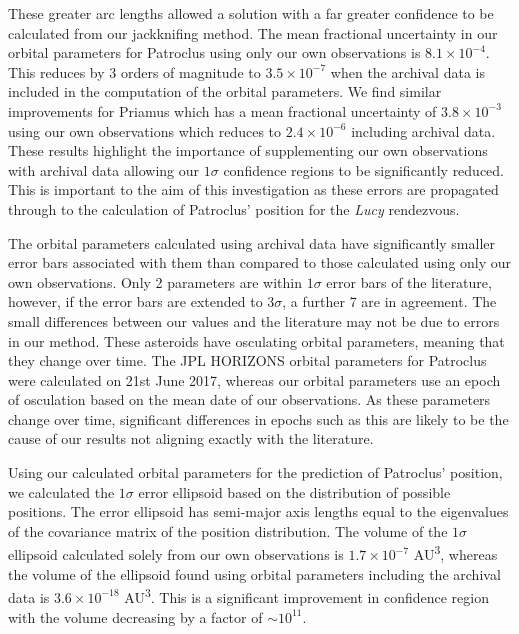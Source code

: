 \documentclass[10pt, twocolumn]{revtex4}    %
\begin{document}
These greater arc lengths allowed a solution with a far greater confidence to be calculated from our jackknifing method. The mean fractional uncertainty in our orbital parameters for Patroclus using only our own observations is $8.1 \times 10^{-4}$. This reduces by 3 orders of magnitude to $3.5 \times 10^{-7}$ when the archival data is included in the computation of the orbital parameters. We find similar improvements for Priamus which has a mean fractional uncertainty of $3.8 \times 10^{-3}$ using our own observations which reduces to $2.4 \times 10^{-6}$ including archival data. These results highlight the importance of supplementing our own observations with archival data allowing our $1\sigma$ confidence regions to be significantly reduced.  This is important to the aim of this investigation as these errors are propagated through to the calculation of Patroclus' position for the \textit{Lucy} rendezvous.

The orbital parameters calculated using archival data have significantly smaller error bars associated with them than compared to those calculated using only our own observations. Only 2 parameters are within $1\sigma$ error bars of the literature, however, if the error bars are extended to $3\sigma$, a further 7 are in agreement. The small differences between our values and the literature may not be due to errors in our method. These asteroids have osculating orbital parameters, meaning that they change over time. The JPL HORIZONS orbital parameters for Patroclus were calculated on 21st June 2017, whereas our orbital parameters use an epoch of osculation based on the mean date of our observations. As these parameters change over time, significant differences in epochs such as this are likely to be the cause of our results not aligning exactly with the literature.

Using our calculated orbital parameters for the prediction of Patroclus' position, we calculated the $1\sigma$ error ellipsoid based on the distribution of possible positions. The error ellipsoid has semi-major axis lengths equal to the eigenvalues of the covariance matrix of the position distribution. The volume of the $1\sigma$ ellipsoid calculated solely from our own observations is $1.7 \times 10^{-7}$ \si{AU^{3}}, whereas the volume of the ellipsoid found using orbital parameters including the archival data is $3.6 \times 10^{-18}$ \si{AU\cubed}. This is a significant improvement in confidence region with the volume decreasing by a factor of ${\sim}10^{11}$. 
\end{document}
